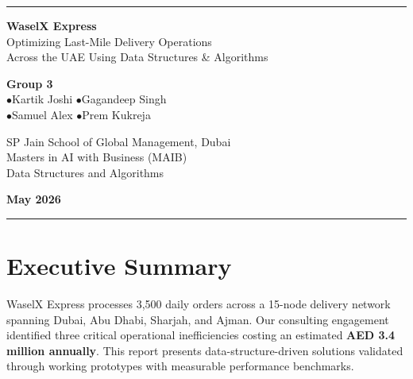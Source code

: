 \documentclass[12pt,a4paper]{article}
\begin{document}
\begin{titlepage}
\centering
\vspace*{1.5cm}
{\color{WaselOrange}\rule{\textwidth}{3pt}}
\vspace{1cm}

{\Huge\bfseries\color{WaselDark} WaselX Express}\\[0.6cm]
{\LARGE\color{WaselDark} Optimizing Last-Mile Delivery Operations\\Across the UAE Using Data Structures \& Algorithms}\\[1.5cm]

\begin{tcolorbox}[colback=WaselLight,colframe=WaselOrange,width=12cm,arc=6pt,boxrule=1.5pt]
\centering\large
\textbf{Group 3}\\[6pt]
 \quad$\bullet$\quad Kartik Joshi \quad$\bullet$\quad Gagandeep Singh\\[3pt]
 \quad$\bullet$\quad Samuel Alex \quad$\bullet$\quad Prem Kukreja
\end{tcolorbox}

\vspace{1.5cm}
{\large SP Jain School of Global Management, Dubai\\[4pt]
Masters in AI with Business (MAIB)\\[4pt]
Data Structures and Algorithms}

\vspace{1cm}
{\large\textbf{May 2026}}

\vfill
{\color{WaselOrange}\rule{\textwidth}{3pt}}
\end{titlepage}

\tableofcontents
\newpage

\section{Executive Summary}

WaselX Express processes 3{,}500 daily orders across a 15-node delivery network spanning Dubai, Abu Dhabi, Sharjah, and Ajman. Our consulting engagement identified three critical operational inefficiencies costing an estimated \textbf{AED 3.4 million annually}. This report presents data-structure-driven solutions validated through working prototypes with measurable performance benchmarks.
\end{document}
